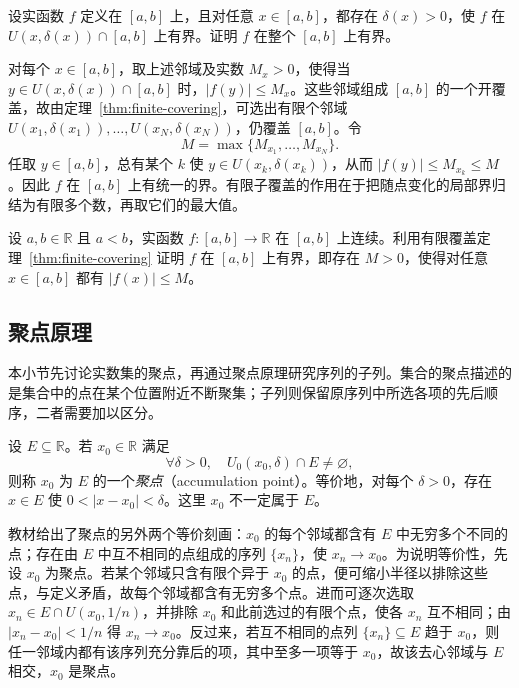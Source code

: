 \begin{example}
设实函数 $f$ 定义在 $[a,b]$ 上，且对任意 $x\in[a,b]$，都存在 $\delta(x)>0$，使 $f$ 在 $U(x,\delta(x))\cap[a,b]$ 上有界。证明 $f$ 在整个 $[a,b]$ 上有界。
\end{example}

\begin{solve}
对每个 $x\in[a,b]$，取上述邻域及实数 $M_x>0$，使得当 $y\in U(x,\delta(x))\cap[a,b]$ 时，$|f(y)|\leq M_x$。这些邻域组成 $[a,b]$ 的一个开覆盖，故由定理~\ref{thm:finite-covering}，可选出有限个邻域 $U(x_1,\delta(x_1)),\ldots,U(x_N,\delta(x_N))$，仍覆盖 $[a,b]$。令
\[
    M=\max\{M_{x_1},\ldots,M_{x_N}\}.
\]
任取 $y\in[a,b]$，总有某个 $k$ 使 $y\in U(x_k,\delta(x_k))$，从而 $|f(y)|\leq M_{x_k}\leq M$。因此 $f$ 在 $[a,b]$ 上有统一的界。有限子覆盖的作用在于把随点变化的局部界归结为有限多个数，再取它们的最大值。
\end{solve}

\begin{example}
\label{ex:continuous-function-bounded-by-finite-cover}
设 $a,b\in\mathbb{R}$ 且 $a<b$，实函数 $f:[a,b]\to\mathbb{R}$ 在 $[a,b]$ 上连续。利用有限覆盖定理~\ref{thm:finite-covering} 证明 $f$ 在 $[a,b]$ 上有界，即存在 $M>0$，使得对任意 $x\in[a,b]$ 都有 $|f(x)|\leq M$。
\end{example}

\subsection{聚点原理}
\label{subsec:accumulation-point-principle}

本小节先讨论实数集的聚点，再通过聚点原理研究序列的子列。集合的聚点描述的是集合中的点在某个位置附近不断聚集；子列则保留原序列中所选各项的先后顺序，二者需要加以区分。

\begin{definition}
\label{def:accumulation-point-of-real-set}
设 $E\subseteq\mathbb{R}$。若 $x_0\in\mathbb{R}$ 满足
\[
    \forall\delta>0,\quad U_0(x_0,\delta)\cap E\neq\varnothing,
\]
则称 $x_0$ 为 $E$ 的一个\emph{聚点}（accumulation point）。等价地，对每个 $\delta>0$，存在 $x\in E$ 使 $0<|x-x_0|<\delta$。这里 $x_0$ 不一定属于 $E$。
\end{definition}

教材给出了聚点的另外两个等价刻画：$x_0$ 的每个邻域都含有 $E$ 中无穷多个不同的点；存在由 $E$ 中互不相同的点组成的序列 $\{x_n\}$，使 $x_n\to x_0$。为说明等价性，先设 $x_0$ 为聚点。若某个邻域只含有限个异于 $x_0$ 的点，便可缩小半径以排除这些点，与定义矛盾，故每个邻域都含有无穷多个点。进而可逐次选取 $x_n\in E\cap U(x_0,1/n)$，并排除 $x_0$ 和此前选过的有限个点，使各 $x_n$ 互不相同；由 $|x_n-x_0|<1/n$ 得 $x_n\to x_0$。反过来，若互不相同的点列 $\{x_n\}\subseteq E$ 趋于 $x_0$，则任一邻域内都有该序列充分靠后的项，其中至多一项等于 $x_0$，故该去心邻域与 $E$ 相交，$x_0$ 是聚点。

